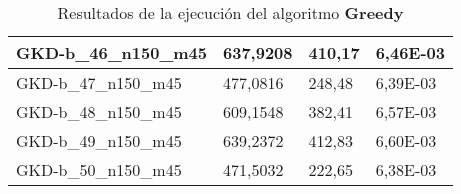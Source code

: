\begin{table}[!ht]
\begin{adjustbox}{height=12cm}
\begin{tabular}{|l|l|l|l|}
        GKD-b\_46\_n150\_m45 & 637,9208 & 410,17 & 6,46E-03 \\ \hline
        GKD-b\_47\_n150\_m45 & 477,0816 & 248,48 & 6,39E-03 \\ \hline
        GKD-b\_48\_n150\_m45 & 609,1548 & 382,41 & 6,57E-03 \\ \hline
        GKD-b\_49\_n150\_m45 & 639,2372 & 412,83 & 6,60E-03 \\ \hline
        GKD-b\_50\_n150\_m45 & 471,5032 & 222,65 & 6,38E-03 \\ \hline
    \end{tabular}
    \end{adjustbox}
    \caption{Resultados de la ejecución del algoritmo \textbf{Greedy}}
\end{table}

\pagebreak